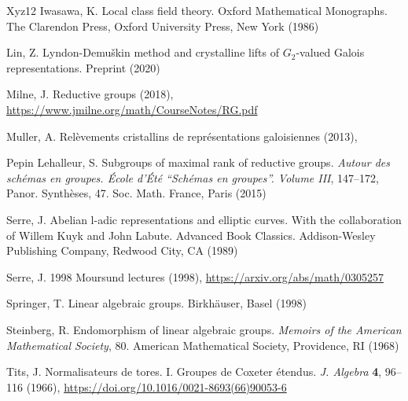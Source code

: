 \documentclass[10pt,a4paper,twoside]{article}
\begin{document}
\begin{thebibliography}{Xyz12}
Iwasawa, K. Local class field theory. Oxford Mathematical Monographs. The Clarendon Press, Oxford University Press, New York (1986)

Lin, Z. Lyndon-Demuškin method and crystalline lifts of $G_2$-valued Galois representations. Preprint (2020)



\raggedright{
Milne, J. Reductive groups (2018),}
\url{https://www.jmilne.org/math/CourseNotes/RG.pdf}

Muller, A. Relèvements cristallins de représentations galoisiennes (2013), 


Pepin Lehalleur, S. Subgroups of maximal rank of reductive groups. {\em Autour des sch\'emas en groupes. \'Ecole d'\'Et\'e “Sch\'emas en groupes”. Volume III}, 147--172, Panor. Synthèses, 47. Soc. Math. France, Paris (2015)



Serre, J. Abelian l-adic representations and elliptic curves. With the collaboration of Willem Kuyk and John Labute. Advanced Book Classics. Addison-Wesley Publishing Company, Redwood City, CA (1989)

\raggedright{
Serre, J. 1998 Moursund lectures (1998),}
\url{https://arxiv.org/abs/math/0305257}


Springer, T. Linear algebraic groups. Birkhäuser, Basel (1998)

Steinberg, R. Endomorphism of linear algebraic groups. {\em Memoirs of the American Mathematical Society}, 80. American Mathematical Society, Providence, RI (1968)

\raggedright{
Tits, J. Normalisateurs de tores. I. Groupes de Coxeter étendus. {\em J. Algebra} \textbf{4}, 96--116 (1966),} \url{https://doi.org/10.1016/0021-8693(66)90053-6}




\end{thebibliography}

\end{document}
